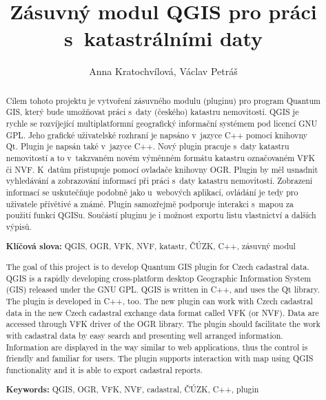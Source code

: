 \documentclass[a4paper,12pt]{article}
\title{Zásuvný modul QGIS pro práci s~katastrálními daty}
\author{Anna Kratochvílová, Václav Petráš}
\newcommand{\klicslova}[2]{\noindent\textbf{#1: }#2}
\begin{document}

\newpage
\pagestyle{empty}
\begin{abstract}
Cílem tohoto projektu je vytvoření zásuvného modulu (pluginu) pro program Quantum GIS,
který bude umožňovat práci s~daty (českého) katastru nemovitostí.
QGIS je rychle se rozvíjející  multiplatformní geografický informační systémem pod licencí GNU GPL.
Jeho grafické uživatelské rozhraní je napsáno v~jazyce C++ pomocí knihovny Qt. Plugin je napsán také v~jazyce C++.
Nový plugin pracuje s~daty katastru nemovitostí a to v~takzvaném novém výměnném formátu katastru označovaném VFK či NVF.
K~datům přistupuje pomocí ovladače knihovny OGR. Plugin by měl usnadnit vyhledávání a zobrazování
informací při práci s~daty katastru nemovitostí.
Zobrazení informací se uskutečňuje podobně jako u~webových aplikací, ovládání je tedy pro uživatele přívětivé a známé.
Plugin samozřejmě podporuje interakci s~mapou za použití funkcí QGISu.
Součástí pluginu je i možnost exportu listu vlastnictví a dalších výpisů.

\bigskip

\klicslova{Klíčová slova}{QGIS, OGR, VFK, NVF, katastr, ČÚZK, C++, zásuvný modul}
\end{abstract}


\begin{abstract}
The goal of this project is to develop Quantum GIS plugin for Czech cadastral data.
QGIS is a rapidly developing cross-platform desktop Geographic Information System (GIS) released under the GNU GPL.
QGIS is written in C++, and uses the Qt library.
The plugin is developed in C++, too.
The new plugin can work with Czech cadastral data in the new Czech cadastral exchange data format called VFK (or NVF).
Data are accessed through VFK driver of the OGR library.
The plugin should facilitate the work with cadastral data by easy search and presenting well arranged information.
Information are displayed in the way similar to web applications, thus the control is friendly and familiar for users.
The plugin supports interaction with map using QGIS functionality and it is able to export cadastral reports.

\bigskip

\klicslova{Keywords}{QGIS, OGR, VFK, NVF, cadastral, ČÚZK, C++, plugin}
\end{abstract}


\newpage

\pagestyle{plain}
\tableofcontents
\newpage
\end{document}
